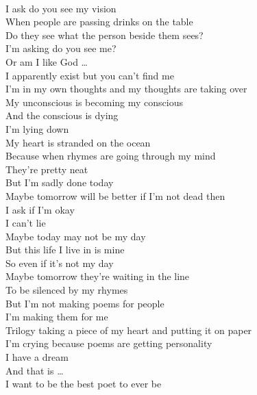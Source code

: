 \documentclass[12pt, b5paper, oneside]{book}
\begin{document}
\\I ask do you see my vision
\\When people are passing drinks on the table
\\Do they see what the person beside them sees?
\\I'm asking do you see me?
\\Or am I like God \dots 
\\I apparently exist but you can't find me
\\I'm in my own thoughts and my thoughts are taking over
\\My unconscious is becoming my conscious
\\And the conscious is dying
\\I'm lying down
\\My heart is stranded on the ocean
\\Because when rhymes are going through my mind
\\They're pretty neat
\\But I'm sadly done today
\\Maybe tomorrow will be better if I'm not dead then
\\I ask if I'm okay
\\I can't lie
\\Maybe today may not be my day
\\But this life I live in is mine
\\So even if it's not my day
\\Maybe tomorrow they're waiting in the line
\\To be silenced by my rhymes
\\But I'm not making poems for people
\\I'm making them for me
\\Trilogy taking a piece of my heart and putting it on paper
\\I'm crying because poems are getting personality
\\I have a dream
\\And that is \dots 
\\I want to be the best poet to ever be 
\end{document}
